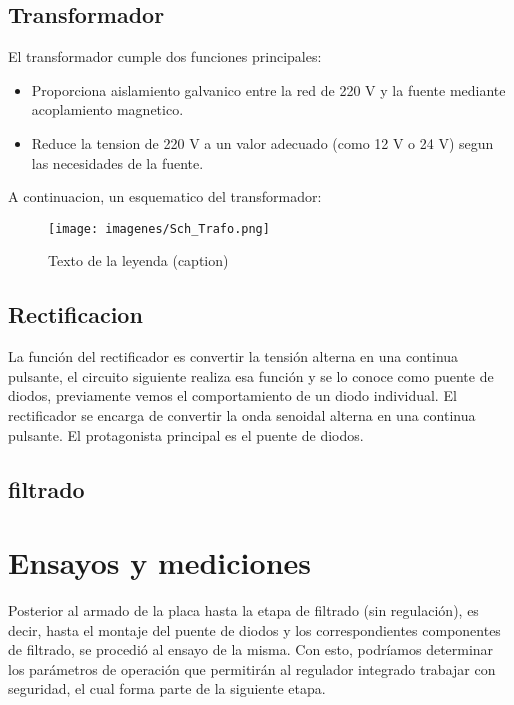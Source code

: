 \documentclass[chaptersright]{informeutn}
\begin{document}
      \section{Transformador}
        El transformador cumple dos funciones principales:
        \begin{itemize}
          \item Proporciona aislamiento galvanico entre la red de 220 V y la fuente mediante acoplamiento magnetico.
          \item Reduce la tension de 220 V a un valor adecuado (como 12 V o 24 V) segun las necesidades de la fuente.
        \end{itemize}
        A continuacion, un esquematico del transformador:
        

        \begin{figure}[h]
          \centering
          \texttt{[image: imagenes/Sch\_Trafo.png]}
          \caption{Texto de la leyenda (caption)}
          \label{fig:etiqueta}
        \end{figure}

      \section{Rectificacion}
        La función del rectificador es convertir la tensión alterna en una continua pulsante, el circuito siguiente 
        realiza esa función y se lo conoce como puente de diodos, previamente vemos el comportamiento de un diodo 
        individual.
        El rectificador se encarga de convertir la onda senoidal alterna en una continua pulsante. El protagonista
        principal es el puente de diodos.

              \section{filtrado}

  \chapter{Ensayos y mediciones}
  
    Posterior al armado de la placa hasta la etapa de filtrado (sin regulación), es decir, hasta el montaje del
    puente de diodos y los correspondientes componentes de filtrado, se procedió al ensayo de la misma. Con esto,
    podríamos determinar los parámetros de operación que permitirán al regulador integrado trabajar con seguridad,
    el cual forma parte de la siguiente etapa.
\end{document}
